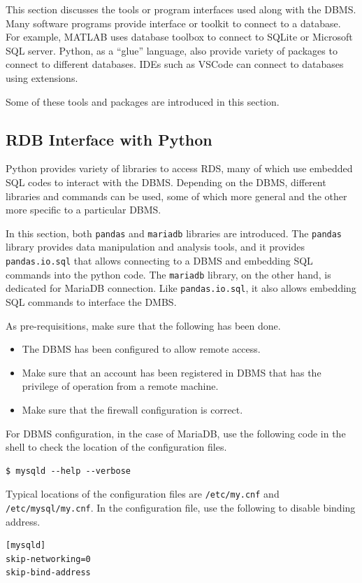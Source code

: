 This section discusses the tools or program interfaces used along with the DBMS. Many software programs provide interface or toolkit to connect to a database. For example, MATLAB uses database toolbox to connect to SQLite or Microsoft SQL server. Python, as a ``glue'' language, also provide variety of packages to connect to different databases. IDEs such as VSCode can connect to databases using extensions.

Some of these tools and packages are introduced in this section.

\subsection{RDB Interface with Python}

Python provides variety of libraries to access RDS, many of which use embedded SQL codes to interact with the DBMS. Depending on the DBMS, different libraries and commands can be used, some of which more general and the other more specific to a particular DBMS.

In this section, both \verb|pandas| and \verb|mariadb| libraries are introduced. The \verb|pandas| library provides data manipulation and analysis tools, and it provides \verb|pandas.io.sql| that allows connecting to a DBMS and embedding SQL commands into the python code. The \verb|mariadb| library, on the other hand, is dedicated for MariaDB connection. Like \verb|pandas.io.sql|, it also allows embedding SQL commands to interface the DMBS.

As pre-requisitions, make sure that the following has been done.
\begin{itemize}
	\item The DBMS has been configured to allow remote access.
	\item Make sure that an account has been registered in DBMS that has the privilege of operation from a remote machine.
	\item Make sure that the firewall configuration is correct.
\end{itemize}

For DBMS configuration, in the case of MariaDB, use the following code in the shell to check the location of the configuration files.
\begin{lstlisting}
$ mysqld --help --verbose
\end{lstlisting}
Typical locations of the configuration files are \verb|/etc/my.cnf| and \verb|/etc/mysql/my.cnf|. In the configuration file, use the following to disable binding address.
\begin{lstlisting}
[mysqld]
skip-networking=0
skip-bind-address
\end{lstlisting}

